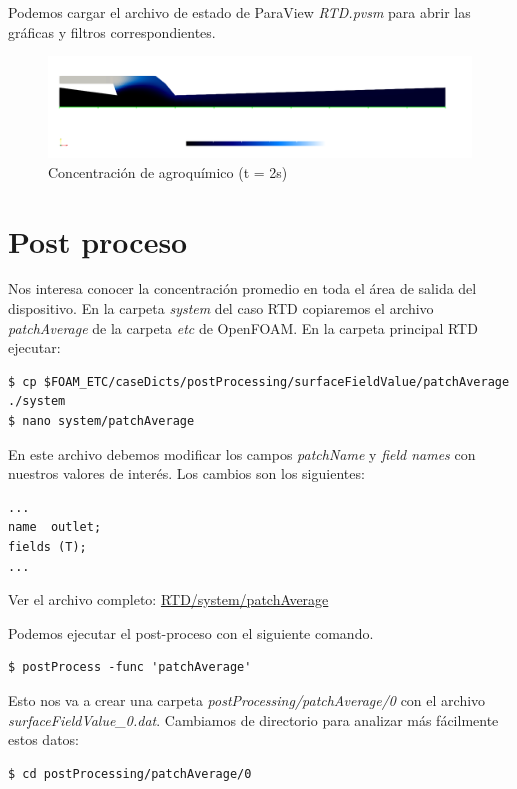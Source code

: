 \documentclass{article}
\begin{document}
Podemos cargar el archivo de estado de ParaView \textit{RTD.pvsm} para abrir las gráficas y filtros correspondientes.

\begin{figure}[h!]
	\centering
	\includegraphics[width=1\textwidth]{Figuras/campo_T.png}
	\caption{Concentración de agroquímico (t = 2s)}
	\label{fig:campo_t}
\end{figure}

\newpage
\section{Post proceso}
Nos interesa conocer la concentración promedio en toda el área de salida del dispositivo. En la carpeta \textit{system} del caso RTD copiaremos el archivo \textit{patchAverage} de la carpeta \textit{etc} de OpenFOAM. En la carpeta principal RTD ejecutar:

\begin{lstlisting}
$ cp $FOAM_ETC/caseDicts/postProcessing/surfaceFieldValue/patchAverage ./system
$ nano system/patchAverage
\end{lstlisting}

En este archivo debemos modificar los campos \textit{patchName} y \textit{field names} con nuestros valores de interés. Los cambios son los siguientes:
\begin{lstlisting}
...
name  outlet;
fields (T);
...
\end{lstlisting}

\noindent Ver el archivo completo: 
\href{https://github.com/guillerolle/adscripcion_cfd/blob/master/01/RTD/system/patchAverage}{RTD/system/patchAverage}
\bigskip

%

Podemos ejecutar el post-proceso con el siguiente comando.

\begin{lstlisting}
$ postProcess -func 'patchAverage'
\end{lstlisting}

Esto nos va a crear una carpeta \textit{postProcessing/patchAverage/0} con el archivo \textit{surfaceFieldValue\_0.dat}. Cambiamos de directorio para analizar más fácilmente estos datos:
\begin{lstlisting}
$ cd postProcessing/patchAverage/0
\end{lstlisting}
\end{document}
